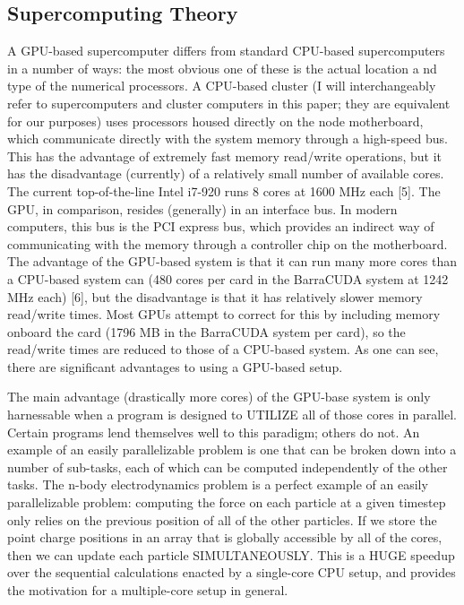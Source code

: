 \documentclass[10pt]{article}
\begin{document}
\subsection{Supercomputing Theory}
A GPU-based supercomputer differs from standard CPU-based supercomputers in a number of ways: the most obvious one of these is the actual location a nd type of the numerical processors. A CPU-based cluster (I will interchangeably refer to supercomputers and cluster computers in this paper; they are equivalent for our purposes) uses processors housed directly on the node motherboard, which communicate directly with the system memory through a high-speed bus. This has the advantage of extremely fast memory read/write operations, but it has the disadvantage (currently) of a relatively small number of available cores. The current top-of-the-line Intel i7-920 runs 8 cores at 1600 MHz each [5]. The GPU, in comparison, resides (generally) in an interface bus. In modern computers, this bus is the PCI express bus, which provides an indirect way of communicating with the memory through a controller chip on the motherboard. The advantage of the GPU-based system is that it can run many more cores than a CPU-based system can (480 cores per card in the BarraCUDA system at 1242 MHz each) [6], but the disadvantage is that it has relatively slower memory read/write times. Most GPUs attempt to correct for this by including memory onboard the card (1796 MB in the BarraCUDA system per card), so the read/write times are reduced to those of a CPU-based system. As one can see, there are significant advantages to using a GPU-based setup.

The main advantage (drastically more cores) of the GPU-base system is only harnessable when a program is designed to UTILIZE all of those cores in parallel. Certain programs lend themselves well to this paradigm; others do not. An example of an easily parallelizable problem is one that can be broken down into a number of sub-tasks, each of which can be computed independently of the other tasks. The n-body electrodynamics problem is a perfect example of an easily parallelizable problem: computing the force on each particle at a given timestep only relies on the previous position of all of the other particles. If we store the point charge positions in an array that is globally accessible by all of the cores, then we can update each particle SIMULTANEOUSLY. This is a HUGE speedup over the sequential calculations enacted by a single-core CPU setup, and provides the motivation for a multiple-core setup in general.
\end{document}
